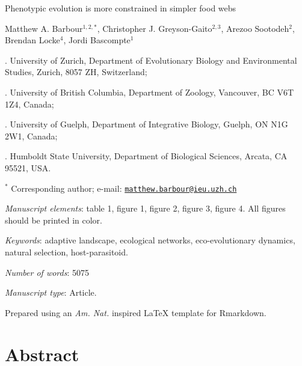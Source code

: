 \documentclass[11pt,]{article}
\title{}
\author{}
\date{}
\begin{document}
\vspace*{0.1cm}

\begin{center} \LARGE Phenotypic evolution is more constrained in simpler food webs \end{center}

\bigskip

\begin{center} \large Matthew A. Barbour$^{1,2,\ast}$, Christopher J. Greyson-Gaito$^{2,3}$, Arezoo Sootodeh$^{2}$, Brendan Locke$^{4}$, Jordi Bascompte$^{1}$ \normalsize \end{center}

\bigskip

. University of Zurich, Department of Evolutionary Biology
and Environmental Studies, Zurich, 8057 ZH, Switzerland;

. University of British Columbia, Department of Zoology,
Vancouver, BC V6T 1Z4, Canada;

. University of Guelph, Department of Integrative Biology,
Guelph, ON N1G 2W1, Canada;

. Humboldt State University, Department of Biological
Sciences, Arcata, CA 95521, USA.

\(^\ast\) Corresponding author; e-mail:
\href{mailto:matthew.barbour@ieu.uzh.ch}{\nolinkurl{matthew.barbour@ieu.uzh.ch}}

\bigskip

\emph{Manuscript elements}: table 1, figure 1, figure 2, figure 3,
figure 4. All figures should be printed in color.

\bigskip

\emph{Keywords}: adaptive landscape, ecological networks,
eco-evolutionary dynamics, natural selection, host-parasitoid.

\bigskip

\emph{Number of words}: 5075

\bigskip

\emph{Manuscript type}: Article.

\bigskip

\footnotesize Prepared using an \emph{Am. Nat.} inspired \LaTeX{}
template for Rmarkdown. \normalsize

\linenumbers{} \modulolinenumbers[3]

\newpage

\section{Abstract}\label{abstract}
\end{document}

